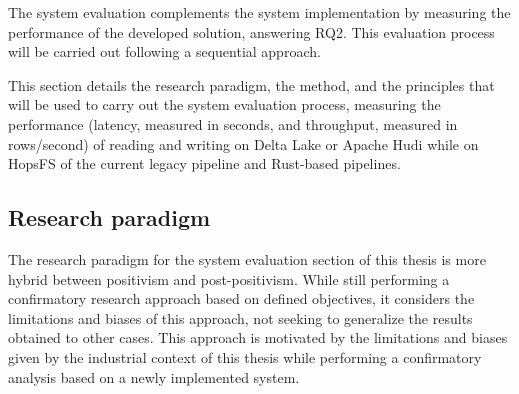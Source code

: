 The system evaluation complements the system implementation by measuring the performance of the developed solution, answering RQ2. This evaluation process will be carried out following a sequential approach.

This section details the research paradigm, the method, and the principles that will be used to carry out the system evaluation process, measuring the performance (latency, measured in seconds, and throughput, measured in rows/second) of reading and writing on Delta Lake or Apache Hudi while on \gls{HopsFS} of the current legacy pipeline and Rust-based pipelines. 

\subsection{Research paradigm}
The research paradigm for the system evaluation section of this thesis is more hybrid between positivism and post-positivism. While still performing a confirmatory research approach based on defined objectives, it considers the limitations and biases of this approach, not seeking to generalize the results obtained to other cases. This approach is motivated by the limitations and biases given by the industrial context of this thesis while performing a confirmatory analysis based on a newly implemented system.

